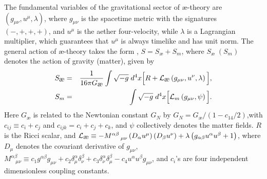 \documentclass[aps,preprintnumbers,twocolumn,showpacs]{revtex4-1}
\begin{document}
The fundamental variables of the gravitational sector of $\mbox{\ae}$-theory are $(g_{\mu\nu}, u^{\mu}, \lambda)$, where $g_{\mu\nu}$ is  the spacetime metric with the signatures $(-, +,+,+)$,  and $u^{\mu}$ is the aether four-velocity, while $\lambda$ is a Lagrangian multiplier, which guarantees that $u^{\mu}$ is always timelike and has unit norm. The general action of $\mbox{\ae}$-theory  takes the form  \cite{Jacobson}, $S = S_{\mbox{\ae}} + S_{m}$, where  $S_{\mbox{\ae}} \; (S_{m})$ denotes the action of gravity (matter),  given  by
\begin{eqnarray}
\label{2.1}
 S_{\mbox{\ae}} &=& \frac{1}{16\pi G_{\mbox{\ae}}}\int{\sqrt{- g} \; d^4x \Big[R + {\cal{L}}_{\mbox{\ae}}\left(g_{\mu\nu}, u^{\nu}, \lambda\right)\Big]},\nonumber\\
 S_{m} &=& \int{\sqrt{- g} \; d^4x \Big[{\cal{L}}_{m}\left(g_{\mu\nu}, \psi\right)\Big]}.
\end{eqnarray}
Here $G_{\mbox{\ae}}$ is related to  the Newtonian constant $G_{N}$ \cite{CL04} by 
$G_{N} = {G_{\mbox{\ae}}}/{(1 - c_{14}/2)}$,with  $c_{ij} \equiv c_i + c_j$ and $c_{ijk} = c_i + c_j + c_k$, and $\psi$ collectively denotes the matter fields. $R$  is  the  Ricci scalar,
 and ${\cal{L}}_{\mbox{\ae}}  \equiv - M^{\alpha\beta}_{~~~~\mu\nu}\left(D_{\alpha}u^{\mu}\right) \left(D_{\beta}u^{\nu}\right) + \lambda \left(g_{\alpha\beta} u^{\alpha}u^{\beta} + 1\right)$,
 where $D_{\mu}$ denotes the covariant derivative of $g_{\mu\nu}$, 
$M^{\alpha\beta}_{~~~~\mu\nu} \equiv c_1 g^{\alpha\beta} g_{\mu\nu} + c_2 \delta^{\alpha}_{\mu}\delta^{\beta}_{\nu} +  c_3 \delta^{\alpha}_{\nu}\delta^{\beta}_{\mu} - c_4 u^{\alpha}u^{\beta} g_{\mu\nu}$,
and $c_i$'s are four  independent dimensionless coupling constants. 
\end{document}
